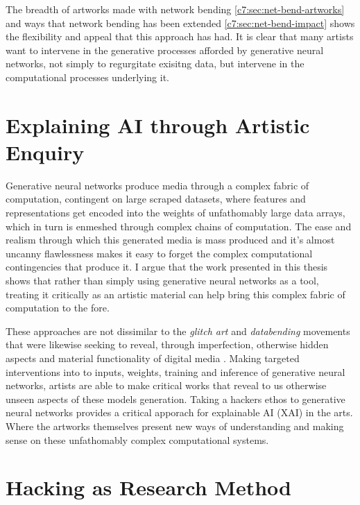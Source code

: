 The breadth of artworks made with network bending \ref{c7:sec:net-bend-artworks} and ways that network bending has been extended \ref{c7:sec:net-bend-impact} shows the flexibility and appeal that this approach has had.
It is clear that many artists want to intervene in the generative processes afforded by generative neural networks, not simply to regurgitate exisitng data, but intervene in the computational processes underlying it.

\section{Explaining AI through Artistic Enquiry}

Generative neural networks produce media through a complex fabric of computation, contingent on large scraped datasets, where features and representations get encoded into the weights of unfathomably large data arrays, which in turn is enmeshed through complex chains of computation. 
The ease and realism through which this generated media is mass produced and it's almost uncanny flawlessness \cite{smith2023ai} makes it easy to forget the complex computational contingencies that produce it. 
I argue that the work presented in this thesis shows that rather than simply using generative neural networks as a tool, treating it critically as an artistic material can help bring this complex fabric of computation to the fore. 

These approaches are not dissimilar to the \textit{glitch art} and \textit{databending} movements that were likewise seeking to reveal, through imperfection, otherwise hidden aspects and material functionality of digital media \cite{kemper2023glitch}.
Making targeted interventions into to inputs, weights, training and inference of generative neural networks, artists are able to make critical works that reveal to us otherwise unseen aspects of these models generation. 
Taking a hackers ethos to generative neural networks provides a critical apporach for explainable AI (XAI) in the arts.
Where the artworks themselves present new ways of understanding and making sense on these unfathomably complex computational systems. 

\section{Hacking as Research Method}





